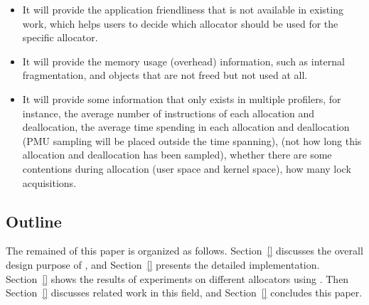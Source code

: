 
\begin{itemize}
\item It will provide the application friendliness that is not available in existing work, which helps users to decide which allocator should be used for the specific allocator. 
\item It will provide the memory usage (overhead) information, such as internal fragmentation, and objects that are not freed but not used at all. 
\item It will provide some information that only exists in multiple profilers, for instance, the average number of instructions of each allocation and deallocation, the average time spending in each allocation and deallocation (PMU sampling will be placed outside the time spanning), (not how long this allocation and deallocation has been sampled), whether there are some contentions during allocation (user space and kernel space), how many lock acquisitions.  
\end{itemize}
 
\subsection*{Outline}

The remained of this paper is organized as follows. Section~\ref{} discusses the overall design purpose of \MP{}, and Section~\ref{} presents the detailed implementation. Section~\ref{} shows the results of experiments on different allocators using \MP{}. Then Section~\ref{} discusses related work in this field, and Section~\ref{} concludes this paper. 